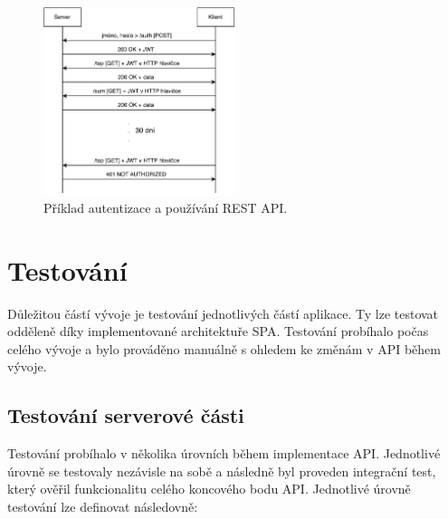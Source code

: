 \begin{figure}[ht]
    \centering
    \includegraphics[width=0.5\textwidth]{fig/auth_flow.pdf}
    \caption{Příklad autentizace a používání REST API.} \label{fig:auth}
\end{figure}

\chapter{Testování}

Důležitou částí vývoje je testování jednotlivých částí aplikace. Ty lze testovat odděleně díky implementované architektuře SPA. Testování probíhalo počas celého vývoje a bylo prováděno manuálně s ohledem ke změnám v API během vývoje.

\section{Testování serverové části}

Testování probíhalo v několika úrovních během implementace API. Jednotlivé úrovně se testovaly nezávisle na sobě a následně byl proveden integrační test, který ověřil funkcionalitu celého koncového bodu API. Jednotlivé úrovně testování lze definovat následovně:

